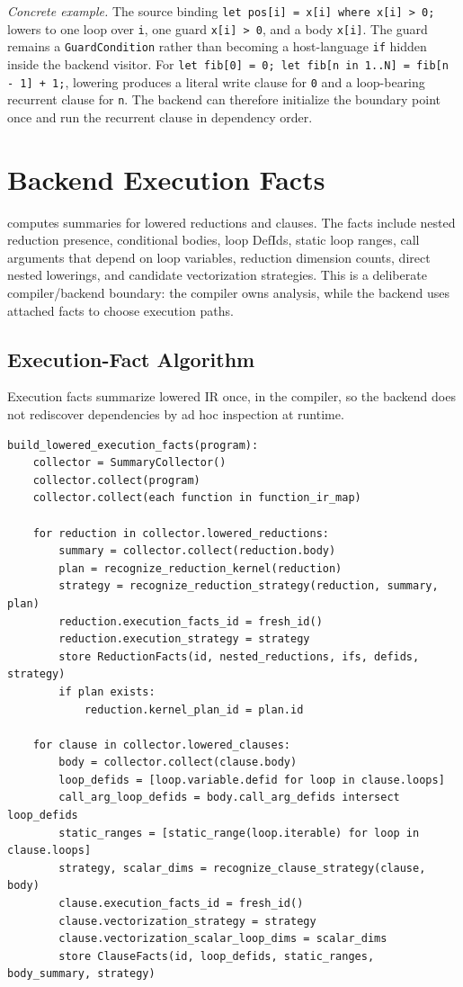 \textit{Concrete example.} The source binding \texttt{let pos[i] = x[i] where
x[i] > 0;} lowers to one loop over \texttt{i}, one guard
\texttt{x[i] > 0}, and a body \texttt{x[i]}. The guard remains a
\texttt{GuardCondition} rather than becoming a host-language \texttt{if} hidden
inside the backend visitor. For \texttt{let fib[0] = 0; let fib[n in 1..N] =
fib[n - 1] + 1;}, lowering produces a literal write clause for \texttt{0} and
a loop-bearing recurrent clause for \texttt{n}. The backend can therefore
initialize the boundary point once and run the recurrent clause in dependency
order.

\section{Backend Execution Facts}

 computes summaries for
lowered reductions and clauses. The facts include nested reduction presence,
conditional bodies, loop DefIds, static loop ranges, call arguments that depend
on loop variables, reduction dimension counts, direct nested lowerings, and
candidate vectorization strategies. This is a deliberate compiler/backend
boundary: the compiler owns analysis, while the backend uses attached facts to
choose execution paths.

\subsection{Execution-Fact Algorithm}

Execution facts summarize lowered IR once, in the compiler, so the backend does
not rediscover dependencies by ad hoc inspection at runtime.

\begin{lstlisting}[style=pythoncode,caption={Lowered execution-fact construction.}]
build_lowered_execution_facts(program):
    collector = SummaryCollector()
    collector.collect(program)
    collector.collect(each function in function_ir_map)

    for reduction in collector.lowered_reductions:
        summary = collector.collect(reduction.body)
        plan = recognize_reduction_kernel(reduction)
        strategy = recognize_reduction_strategy(reduction, summary, plan)
        reduction.execution_facts_id = fresh_id()
        reduction.execution_strategy = strategy
        store ReductionFacts(id, nested_reductions, ifs, defids, strategy)
        if plan exists:
            reduction.kernel_plan_id = plan.id

    for clause in collector.lowered_clauses:
        body = collector.collect(clause.body)
        loop_defids = [loop.variable.defid for loop in clause.loops]
        call_arg_loop_defids = body.call_arg_defids intersect loop_defids
        static_ranges = [static_range(loop.iterable) for loop in clause.loops]
        strategy, scalar_dims = recognize_clause_strategy(clause, body)
        clause.execution_facts_id = fresh_id()
        clause.vectorization_strategy = strategy
        clause.vectorization_scalar_loop_dims = scalar_dims
        store ClauseFacts(id, loop_defids, static_ranges, body_summary, strategy)
\end{lstlisting}

